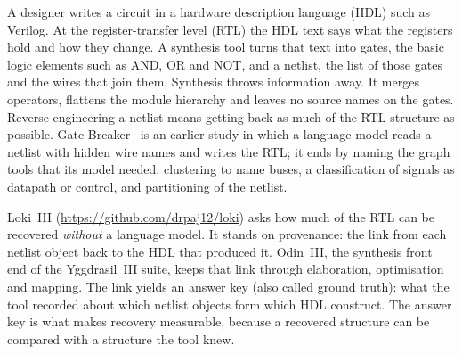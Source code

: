 \documentclass[conference]{IEEEtran}
\begin{document}
A designer writes a circuit in a hardware description language (HDL) such as Verilog. %
At the register-transfer level (RTL) the HDL text says what the registers hold and how they %
change. A synthesis tool turns that text into gates, the basic logic elements such as AND, %
OR and NOT, and a netlist, the list of those gates and the wires that join them. %
Synthesis throws information away. It merges operators, flattens the module hierarchy and
leaves no source names on the gates. Reverse engineering a netlist means getting back as
much of the RTL structure as possible. Gate-Breaker~\cite{faruque2025gatebreaker} is an %
earlier study in which a language model reads a netlist with hidden wire names and writes the
RTL; it ends by naming the graph tools that its model needed: clustering to name buses, a
classification of signals as datapath or control, and partitioning of the netlist.

Loki~III (\url{https://github.com/drpaj12/loki}) asks how much of the RTL can be recovered
\emph{without} a language model. It stands on provenance: the link from each netlist object %
back to the HDL that produced it. Odin~III, the synthesis front end of the Yggdrasil~III suite, %
keeps that link through elaboration, optimisation and mapping. The link yields an answer key %
(also called ground truth): what the tool recorded about which netlist objects form which
HDL construct. The answer key is what makes recovery measurable, because a recovered
structure can be compared with a structure the tool knew.
\end{document}
